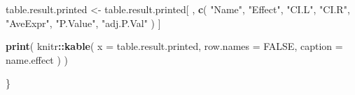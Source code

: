 \documentclass[]{article}
\newenvironment{Shaded}{\begin{snugshade}}{\end{snugshade}}
\newcommand{\DataTypeTok}[1]{\textcolor[rgb]{0.13,0.29,0.53}{#1}}
\newcommand{\KeywordTok}[1]{\textcolor[rgb]{0.13,0.29,0.53}{\textbf{#1}}}
\newcommand{\NormalTok}[1]{#1}
\newcommand{\OperatorTok}[1]{\textcolor[rgb]{0.81,0.36,0.00}{\textbf{#1}}}
\newcommand{\OtherTok}[1]{\textcolor[rgb]{0.56,0.35,0.01}{#1}}
\newcommand{\StringTok}[1]{\textcolor[rgb]{0.31,0.60,0.02}{#1}}
\begin{document}
\begin{Shaded}
\begin{Highlighting}[]
\NormalTok{  table.result.printed <-}\StringTok{ }
\StringTok{    }\NormalTok{table.result.printed[ , }
                          \KeywordTok{c}\NormalTok{( }
                            \StringTok{"Name"}\NormalTok{,}
                            \StringTok{"Effect"}\NormalTok{,}
                            \StringTok{"CI.L"}\NormalTok{,}
                            \StringTok{"CI.R"}\NormalTok{,}
                            \StringTok{"AveExpr"}\NormalTok{, }
                            \StringTok{"P.Value"}\NormalTok{,}
                            \StringTok{"adj.P.Val"}
\NormalTok{                            )}
\NormalTok{                          ]}
  
  \KeywordTok{print}\NormalTok{( }
\NormalTok{    knitr}\OperatorTok{::}\KeywordTok{kable}\NormalTok{( }
      \DataTypeTok{x =}\NormalTok{ table.result.printed,}
      \DataTypeTok{row.names =} \OtherTok{FALSE}\NormalTok{,}
      \DataTypeTok{caption =}\NormalTok{ name.effect}
\NormalTok{    )}
\NormalTok{  )}
  
\NormalTok{\}}
\end{Highlighting}
\end{Shaded}
\end{document}

